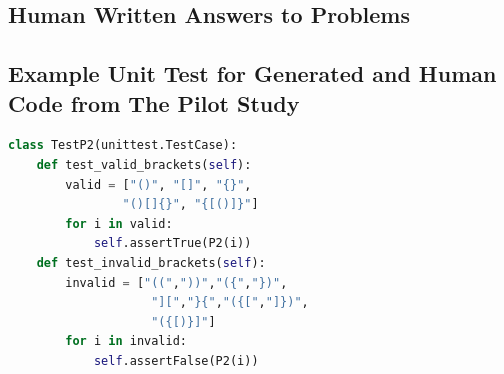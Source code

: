\documentclass[manuscript,screen,review,sigconf]{acmart}
\begin{document}
\subsection{Human Written Answers to Problems}

\subsection{Example Unit Test for Generated and Human Code from The Pilot Study}
\begin{lstlisting}[language=Python]
class TestP2(unittest.TestCase):
    def test_valid_brackets(self):
        valid = ["()", "[]", "{}",
                "()[]{}", "{[()]}"]
        for i in valid:
            self.assertTrue(P2(i))
    def test_invalid_brackets(self):
        invalid = ["((","))","({","})",
                    "][","}{","({[","]})",
                    "({[)}]"]
        for i in invalid:
            self.assertFalse(P2(i))
\end{lstlisting}
\end{document}
